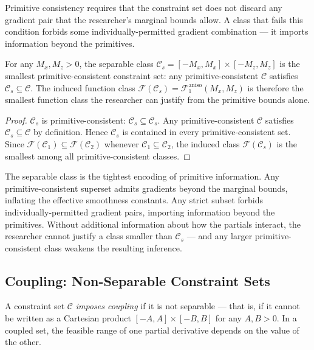 Primitive consistency requires that the constraint set does not discard any gradient pair that the researcher's marginal bounds allow.
A class that fails this condition forbids some individually-permitted gradient combination --- it imports information beyond the primitives.

\begin{proposition}\label{prop:coupling_agnostic}
	For any $M_x, M_z > 0$, the separable class $\mathcal{C}_s = [-M_x, M_x] \times [-M_z, M_z]$ is the smallest primitive-consistent constraint set: any primitive-consistent $\mathcal{C}$ satisfies $\mathcal{C}_s \subseteq \mathcal{C}$.
	The induced function class $\mathcal{F}(\mathcal{C}_s) = \mathcal{F}_1^{\mathrm{aniso}}(M_x, M_z)$ is therefore the smallest function class the researcher can justify from the primitive bounds alone.
\end{proposition}

\begin{proof}
	$\mathcal{C}_s$ is primitive-consistent: $\mathcal{C}_s \subseteq \mathcal{C}_s$.
	Any primitive-consistent $\mathcal{C}$ satisfies $\mathcal{C}_s \subseteq \mathcal{C}$ by definition.
	Hence $\mathcal{C}_s$ is contained in every primitive-consistent set.
	Since $\mathcal{F}(\mathcal{C}_1) \subseteq \mathcal{F}(\mathcal{C}_2)$ whenever $\mathcal{C}_1 \subseteq \mathcal{C}_2$, the induced class $\mathcal{F}(\mathcal{C}_s)$ is the smallest among all primitive-consistent classes.
\end{proof}

The separable class is the tightest encoding of primitive information.
Any primitive-consistent superset admits gradients beyond the marginal bounds, inflating the effective smoothness constants.
Any strict subset forbids individually-permitted gradient pairs, importing information beyond the primitives.
Without additional information about how the partials interact, the researcher cannot justify a class smaller than $\mathcal{C}_s$ --- and any larger primitive-consistent class weakens the resulting inference.


\subsection{Coupling: Non-Separable Constraint Sets}\label{sec:argument:coupling}

\begin{definition}[Coupling]\label{def:coupling}
	A constraint set $\mathcal{C}$ \emph{imposes coupling} if it is not separable --- that is, if it cannot be written as a Cartesian product $[-A, A] \times [-B, B]$ for any $A, B > 0$.
	In a coupled set, the feasible range of one partial derivative depends on the value of the other.
\end{definition}

